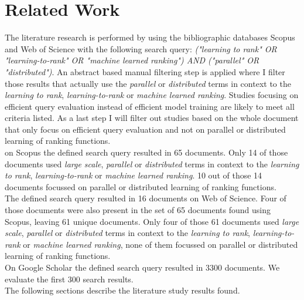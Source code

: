 \chapter{Related Work}
The literature research is performed by using the bibliographic databases Scopus and Web of Science with the following search query: \emph{("learning to rank" OR "learning-to-rank" OR "machine learned ranking") AND ("parallel" OR "distributed")}. An abstract based manual filtering step is applied where I filter those results that actually use the \emph{parallel} or \emph{distributed} terms in context to the \emph{learning to rank}, \emph{learning-to-rank} or \emph{machine learned ranking}. Studies focusing on efficient query evaluation instead of efficient model training are likely to meet all criteria listed. As a last step I will filter out studies based on the whole document that only focus on efficient query evaluation and not on parallel or distributed learning of ranking functions.\\

on Scopus the defined search query resulted in 65 documents. Only 14 of those documents used \emph{large scale}, \emph{parallel} or \emph{distributed} terms in context to the \emph{learning to rank}, \emph{learning-to-rank} or \emph{machine learned ranking}. 10 out of those 14 documents focussed on parallel or distributed learning of ranking functions.\\

The defined search query resulted in 16 documents on Web of Science. Four of those documents were also present in the set of 65 documents found using Scopus, leaving 61 unique documents. Only four of those 61 documents used \emph{large scale}, \emph{parallel} or \emph{distributed} terms in context to the \emph{learning to rank}, \emph{learning-to-rank} or \emph{machine learned ranking}, none of them focussed on parallel or distributed learning of ranking functions.\\

On Google Scholar the defined search query resulted in 3300 documents. We evaluate the first 300 search results.\\

The following sections describe the literature study results found.

